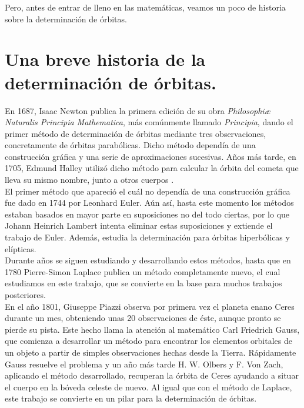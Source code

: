 Pero, antes de entrar de lleno en las matemáticas, veamos un poco de historia sobre la determinación de órbitas.\\


\section{Una breve historia de la determinación de órbitas.}
\label{sec:history}
En 1687, Isaac Newton publica la primera edición de su obra \textit{Philosophiæ Naturalis Principia Mathematica}, más comúnmente llamado \textit{Principia}, dando el primer método de determinación de órbitas mediante tres observaciones, concretamente de órbitas parabólicas. Dicho método dependía de una construcción gráfica y una serie de aproximaciones sucesivas. Años más tarde, en 1705, Edmund Halley utilizó dicho método para calcular la órbita del cometa que lleva su mismo nombre, junto a otros cuerpos \cite{moulton}.\\

El primer método que apareció el cuál no dependía de una construcción gráfica fue dado en 1744 por Leonhard Euler. Aún así, hasta este momento los métodos estaban basados en mayor parte en suposiciones no del todo ciertas, por lo que Johann Heinrich Lambert intenta eliminar estas suposiciones y extiende el trabajo de Euler. Además, estudia la determinación para órbitas hiperbólicas y elípticas.\\

Durante años se siguen estudiando y desarrollando estos métodos, hasta que en 1780 Pierre-Simon Laplace publica un método completamente nuevo, el cual estudiamos en este trabajo, que se convierte en la base para muchos trabajos posteriores.\\

En el año 1801, Giuseppe Piazzi observa por primera vez el planeta enano Ceres durante un mes, obteniendo unas 20 observaciones de éste, aunque pronto se pierde su pista. Este hecho llama la atención al matemático Carl Friedrich Gauss, que comienza a desarrollar un método para encontrar los elementos orbitales de un objeto a partir de simples observaciones hechas desde la Tierra. Rápidamente Gauss resuelve el problema y un año más tarde H. W. Olbers y F. Von Zach, aplicando el método desarrollado, recuperan la órbita de Ceres ayudando a situar el cuerpo en la bóveda celeste de nuevo. Al igual que con el método de Laplace, este trabajo se convierte en un pilar para la determinación de órbitas. \cite{moulton}\\


